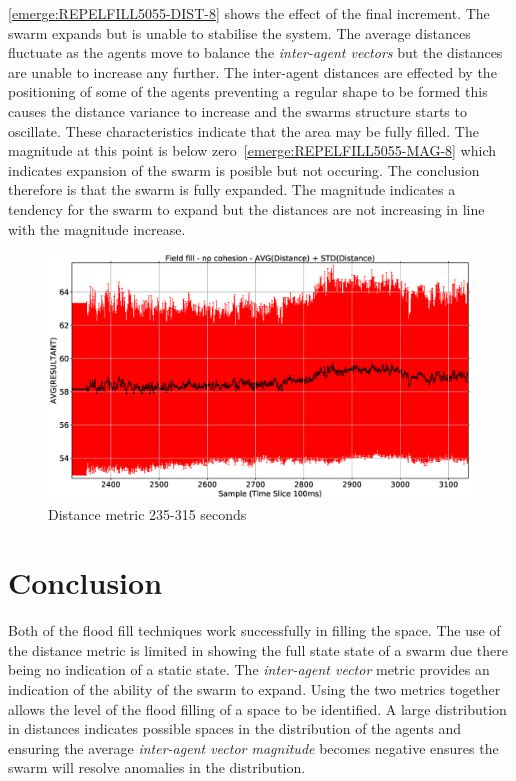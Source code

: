 \autoref{emerge:REPELFILL5055-DIST-8} shows the effect of the final increment. The swarm expands but is unable to stabilise the system. The average distances fluctuate as the agents move to balance the \textit{inter-agent vectors} but the distances are unable to increase any further. The inter-agent distances are effected by the positioning of some of the agents preventing a regular shape to be formed this causes the distance variance to increase and the swarms structure starts to oscillate. These characteristics indicate that the area may be fully filled. The magnitude at this point is below zero~\autoref{emerge:REPELFILL5055-MAG-8} which indicates expansion of the swarm is posible but not occuring. The conclusion therefore is that the swarm is fully expanded. The magnitude indicates a tendency for the swarm to expand but the distances are not increasing in line with the magnitude increase. 

\begin{figure}[H]
\begin{center}
\includegraphics[width=12cm]{CHAPTER-8/figures/REPELFILL5055-DIST-8}
\end{center}
\caption{Distance metric 235-315 seconds\label{emerge:REPELFILL5055-DIST-8}}
\end{figure}

\section{Conclusion}
Both of the flood fill techniques work successfully in filling the space. The use of the distance metric is limited in showing the full state state of a swarm due there being no indication of a static state. The \textit{inter-agent vector} metric provides an indication of the ability of the swarm to expand. Using the two metrics together allows the level of the flood filling of a space to be identified. A large distribution in distances indicates possible spaces in the distribution of the agents and ensuring the average \textit{inter-agent vector magnitude} becomes negative ensures the swarm will resolve anomalies in the distribution.

